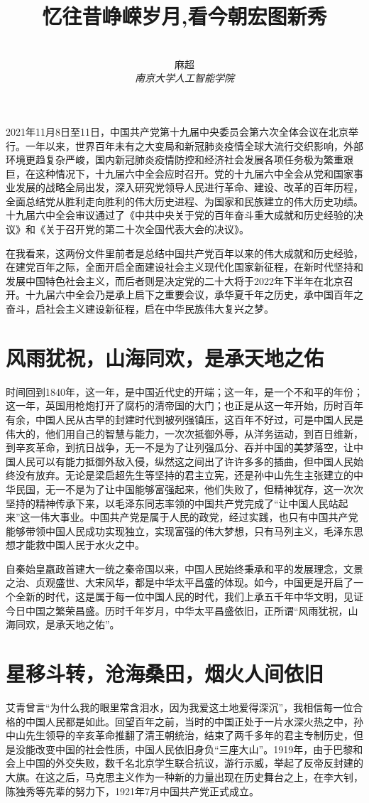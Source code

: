 \documentclass[12pt,a4paper]{ctexart}
\title{\textbf{忆往昔峥嵘岁月,看今朝宏图新秀}}
\author{
\\
\Large{麻超 \quad 201300066}
\\[6pt]
{ \large \textit{南京大学人工智能学院}}\\[2pt]
}
\date{}
\begin{document}
\maketitle
\setcounter{page}{1}
2021年11月8日至11日，中国共产党第十九届中央委员会第六次全体会议在北京举行。一年以来，世界百年未有之大变局和新冠肺炎疫情全球大流行交织影响，外部环境更趋复杂严峻，国内新冠肺炎疫情防控和经济社会发展各项任务极为繁重艰巨，在这种情况下，十九届六中全会应时召开。党的十九届六中全会从党和国家事业发展的战略全局出发，深入研究党领导人民进行革命、建设、改革的百年历程，全面总结党从胜利走向胜利的伟大历史进程、为国家和民族建立的伟大历史功绩。十九届六中全会审议通过了《中共中央关于党的百年奋斗重大成就和历史经验的决议》和《关于召开党的第二十次全国代表大会的决议》。

在我看来，这两份文件里前者是总结中国共产党百年以来的伟大成就和历史经验，在建党百年之际，全面开启全面建设社会主义现代化国家新征程，在新时代坚持和发展中国特色社会主义，而后者则是决定党的二十大将于2022年下半年在北京召开。十九届六中全会乃是承上启下之重要会议，承华夏千年之历史，承中国百年之奋斗，启社会主义建设新征程，启在中华民族伟大复兴之梦。
\section{\textbf{\Large{风雨犹祝，山海同欢，是承天地之佑}}}
时间回到1840年，这一年，是中国近代史的开端；这一年，是一个不和平的年份；这一年，英国用枪炮打开了腐朽的清帝国的大门；也正是从这一年开始，历时百年有余，中国人民从古早的封建时代到被列强镇压，这百年不好过，可是中国人民是伟大的，他们用自己的智慧与能力，一次次抵御外辱，从洋务运动，到百日维新，到辛亥革命，到抗日战争，无一不是为了让列强瓜分、吞并中国的美梦落空，让中国人民可以有能力抵御外敌入侵，纵然这之间出了许许多多的插曲，但中国人民始终没有放弃。无论是梁启超先生等坚持的君主立宪，还是孙中山先生主张建立的中华民国，无一不是为了让中国能够富强起来，他们失败了，但精神犹存，这一次次坚持的精神传承下来，以毛泽东同志率领的中国共产党完成了“让中国人民站起来”这一伟大事业。中国共产党是属于人民的政党，经过实践，也只有中国共产党能够带领中国人民成功实现独立，实现富强的伟大梦想，只有马列主义，毛泽东思想才能救中国人民于水火之中。

​自秦始皇嬴政首建大一统之秦帝国以来，中国人民始终秉承和平的发展理念，文景之治、贞观盛世、大宋风华，都是中华太平昌盛的体现。如今，中国更是开启了一个全新的时代，这是属于每一位中国人民的时代，我们上承五千年中华文明，见证今日中国之繁荣昌盛。历时千年岁月，中华太平昌盛依旧，正所谓“风雨犹祝，山海同欢，是承天地之佑”。
\section{\textbf{\Large{星移斗转，沧海桑田，烟火人间依旧}}}
艾青曾言“为什么我的眼里常含泪水，因为我爱这土地爱得深沉”，我相信每一位合格的中国人民都是如此。回望百年之前，当时的中国正处于一片水深火热之中，孙中山先生领导的辛亥革命推翻了清王朝统治，结束了两千多年的君主专制历史，但是没能改变中国的社会性质，中国人民依旧身负“三座大山”。1919年，由于巴黎和会上中国的外交失败，数千名北京学生联合抗议，游行示威，举起了反帝反封建的大旗。在这之后，马克思主义作为一种新的力量出现在历史舞台之上，在李大钊，陈独秀等先辈的努力下，1921年7月中国共产党正式成立。
\end{document}
